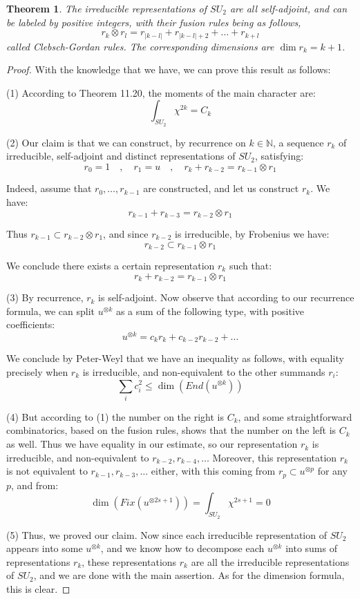 \documentclass[12pt]{amsbook}
\newtheorem{theorem}{Theorem}[chapter]
\begin{document}

\begin{theorem}
The irreducible representations of $SU_2$ are all self-adjoint, and can be labeled by positive integers, with their fusion rules being as follows,
$$r_k\otimes r_l=r_{|k-l|}+r_{|k-l|+2}+\ldots+r_{k+l}$$
called Clebsch-Gordan rules. The corresponding dimensions are $\dim r_k=k+1$.
\end{theorem}

\begin{proof}
With the knowledge that we have, we can prove this result as follows:

\medskip

(1) According to Theorem 11.20, the moments of the main character are:
$$\int_{SU_2}\chi^{2k}=C_k$$

(2) Our claim is that we can construct, by recurrence on $k\in\mathbb N$, a sequence $r_k$ of irreducible, self-adjoint and distinct representations of $SU_2$, satisfying:
$$r_0=1\quad,\quad
r_1=u\quad,\quad 
r_k+r_{k-2}=r_{k-1}\otimes r_1$$

Indeed, assume that $r_0,\ldots,r_{k-1}$ are constructed, and let us construct $r_k$. We have:
$$r_{k-1}+r_{k-3}=r_{k-2}\otimes r_1$$

Thus $r_{k-1}\subset r_{k-2}\otimes r_1$, and since $r_{k-2}$ is irreducible, by Frobenius we have:
$$r_{k-2}\subset r_{k-1}\otimes r_1$$

We conclude there exists a certain representation $r_k$ such that:
$$r_k+r_{k-2}=r_{k-1}\otimes r_1$$

(3) By recurrence, $r_k$ is self-adjoint. Now observe that according to our recurrence formula, we can split $u^{\otimes k}$ as a sum of the following type, with positive coefficients:  
$$u^{\otimes k}=c_kr_k+c_{k-2}r_{k-2}+\ldots$$

We conclude by Peter-Weyl that we have an inequality as follows, with equality precisely when $r_k$ is irreducible, and non-equivalent to the other summands $r_i$:
$$\sum_ic_i^2\leq\dim(End(u^{\otimes k}))$$

(4) But according to (1) the number on the right is $C_k$, and some straightforward combinatorics, based on the fusion rules, shows that the number on the left is $C_k$ as well. Thus we have equality in our estimate, so our representation $r_k$ is irreducible, and non-equivalent to $r_{k-2},r_{k-4},\ldots$ Moreover, this representation $r_k$ is not equivalent to $r_{k-1},r_{k-3},\ldots$ either, with this coming from $r_p\subset u^{\otimes p}$ for any $p$, and from:
$$\dim(Fix(u^{\otimes 2s+1}))=\int_{SU_2}\chi^{2s+1}=0$$

(5) Thus, we proved our claim. Now since each irreducible representation of $SU_2$ appears into some $u^{\otimes k}$, and we know how to decompose each $u^{\otimes k}$ into sums of representations $r_k$, these representations $r_k$ are all the irreducible representations of $SU_2$, and we are done with the main assertion. As for the dimension formula, this is clear.
\end{proof}
\end{document}
